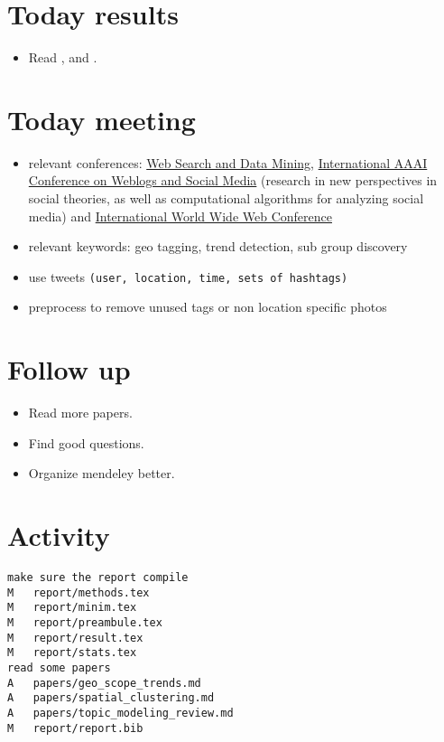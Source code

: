 \section*{Today results}
\begin{itemize}
	\item Read \cite{topicModel}, \cite{GeoScope} and \cite{Deng2009}.
\end{itemize}
\section*{Today meeting}
\begin{itemize}
	\item relevant conferences:
		\href{http://www.wsdm-conference.org/2014}{Web Search and Data
		Mining},
		\href{http://www.icwsm.org/2014/index.php}{International AAAI
		Conference on Weblogs and Social Media} (research in new
		perspectives in social theories, as well as computational
		algorithms for analyzing social media) and
		\href{http://www2014.kr/}{International World Wide Web
		Conference}
	\item relevant keywords: \textsf{geo tagging}, \textsf{trend detection}, \textsf{sub group discovery}
	\item use tweets \texttt{(user, location, time, sets of hashtags)}
	\item preprocess to remove unused tags or non location specific photos
\end{itemize}
\section*{Follow up}
\begin{itemize}
	\item Read more papers.
	\item Find good questions.
	\item Organize mendeley better.
\end{itemize}

\section*{Activity}
\begin{verbatim}
make sure the report compile
M	report/methods.tex
M	report/minim.tex
M	report/preambule.tex
M	report/result.tex
M	report/stats.tex
read some papers
A	papers/geo_scope_trends.md
A	papers/spatial_clustering.md
A	papers/topic_modeling_review.md
M	report/report.bib
\end{verbatim}